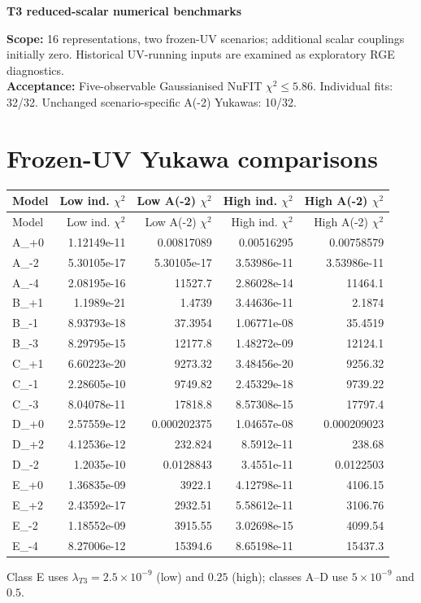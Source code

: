 \documentclass[10pt,a4paper]{article}
\begin{document}
\begin{center}\LARGE\bfseries T3 reduced-scalar numerical benchmarks\end{center}
\noindent\textbf{Scope:} 16 representations, two frozen-UV scenarios; additional scalar couplings initially zero. Historical UV-running inputs are examined as exploratory RGE diagnostics.\\
\textbf{Acceptance:} Five-observable Gaussianised NuFIT $\chi^2\leq 5.86$. Individual fits: 32/32. Unchanged scenario-specific A(-2) Yukawas: 10/32.
\section*{Frozen-UV Yukawa comparisons}
\small\begin{longtable}{lrrrr}
\toprule Model & Low ind. $\chi^2$ & Low A(-2) $\chi^2$ & High ind. $\chi^2$ & High A(-2) $\chi^2$ \\
\midrule\endfirsthead
\toprule Model & Low ind. $\chi^2$ & Low A(-2) $\chi^2$ & High ind. $\chi^2$ & High A(-2) $\chi^2$ \\
\midrule\endhead
A\_+0 & 1.12149e-11 & 0.00817089 & 0.00516295 & 0.00758579 \\
A\_-2 & 5.30105e-17 & 5.30105e-17 & 3.53986e-11 & 3.53986e-11 \\
A\_-4 & 2.08195e-16 & 11527.7 & 2.86028e-14 & 11464.1 \\
B\_+1 & 1.1989e-21 & 1.4739 & 3.44636e-11 & 2.1874 \\
B\_-1 & 8.93793e-18 & 37.3954 & 1.06771e-08 & 35.4519 \\
B\_-3 & 8.29795e-15 & 12177.8 & 1.48272e-09 & 12124.1 \\
C\_+1 & 6.60223e-20 & 9273.32 & 3.48456e-20 & 9256.32 \\
C\_-1 & 2.28605e-10 & 9749.82 & 2.45329e-18 & 9739.22 \\
C\_-3 & 8.04078e-11 & 17818.8 & 8.57308e-15 & 17797.4 \\
D\_+0 & 2.57559e-12 & 0.000202375 & 1.04657e-08 & 0.000209023 \\
D\_+2 & 4.12536e-12 & 232.824 & 8.5912e-11 & 238.68 \\
D\_-2 & 1.2035e-10 & 0.0128843 & 3.4551e-11 & 0.0122503 \\
E\_+0 & 1.36835e-09 & 3922.1 & 4.12798e-11 & 4106.15 \\
E\_+2 & 2.43592e-17 & 2932.51 & 5.58612e-11 & 3106.76 \\
E\_-2 & 1.18552e-09 & 3915.55 & 3.02698e-15 & 4099.54 \\
E\_-4 & 8.27006e-12 & 15394.6 & 8.65198e-11 & 15437.3 \\
\bottomrule\end{longtable}\normalsize
\noindent Class E uses $\lambda_{T3}=2.5\times10^{-9}$ (low) and $0.25$ (high); classes A--D use $5\times10^{-9}$ and $0.5$.
\end{document}
